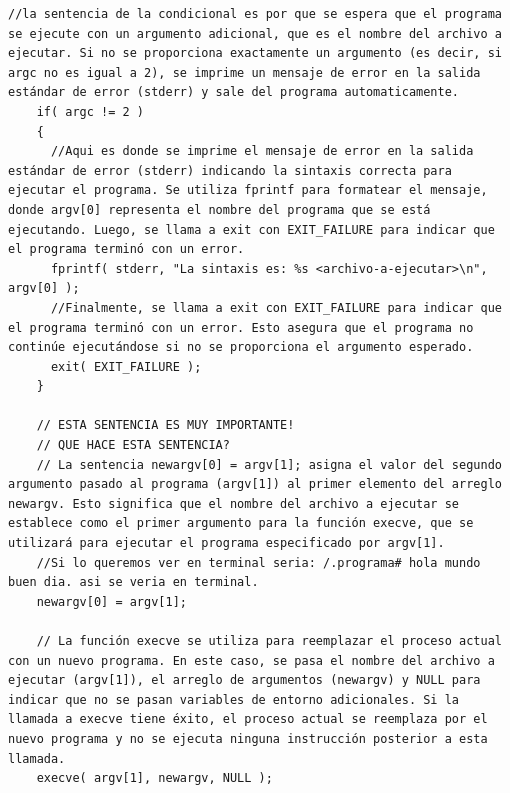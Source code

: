 \documentclass[letterpaper,11pt]{article}
\begin{document}
\begin{enumerate}[label=\alph*)]
\begin{enumerate}[label=\arabic*.]
\begin{lstlisting}[style=cstyle, caption={Programa 21\_execve.c comentado}, label={lst:programa21_execve_comentado}]
    //la sentencia de la condicional es por que se espera que el programa se ejecute con un argumento adicional, que es el nombre del archivo a ejecutar. Si no se proporciona exactamente un argumento (es decir, si argc no es igual a 2), se imprime un mensaje de error en la salida estándar de error (stderr) y sale del programa automaticamente.
    if( argc != 2 )
    {
      //Aqui es donde se imprime el mensaje de error en la salida estándar de error (stderr) indicando la sintaxis correcta para ejecutar el programa. Se utiliza fprintf para formatear el mensaje, donde argv[0] representa el nombre del programa que se está ejecutando. Luego, se llama a exit con EXIT_FAILURE para indicar que el programa terminó con un error.
      fprintf( stderr, "La sintaxis es: %s <archivo-a-ejecutar>\n", argv[0] );
      //Finalmente, se llama a exit con EXIT_FAILURE para indicar que el programa terminó con un error. Esto asegura que el programa no continúe ejecutándose si no se proporciona el argumento esperado.
      exit( EXIT_FAILURE );
    }

    // ESTA SENTENCIA ES MUY IMPORTANTE!
    // QUE HACE ESTA SENTENCIA? 
    // La sentencia newargv[0] = argv[1]; asigna el valor del segundo argumento pasado al programa (argv[1]) al primer elemento del arreglo newargv. Esto significa que el nombre del archivo a ejecutar se establece como el primer argumento para la función execve, que se utilizará para ejecutar el programa especificado por argv[1].
    //Si lo queremos ver en terminal seria: /.programa# hola mundo buen dia. asi se veria en terminal.
    newargv[0] = argv[1];

    // La función execve se utiliza para reemplazar el proceso actual con un nuevo programa. En este caso, se pasa el nombre del archivo a ejecutar (argv[1]), el arreglo de argumentos (newargv) y NULL para indicar que no se pasan variables de entorno adicionales. Si la llamada a execve tiene éxito, el proceso actual se reemplaza por el nuevo programa y no se ejecuta ninguna instrucción posterior a esta llamada.
    execve( argv[1], newargv, NULL );
    

\end{lstlisting}
\end{enumerate}
\end{enumerate}
\end{document}
